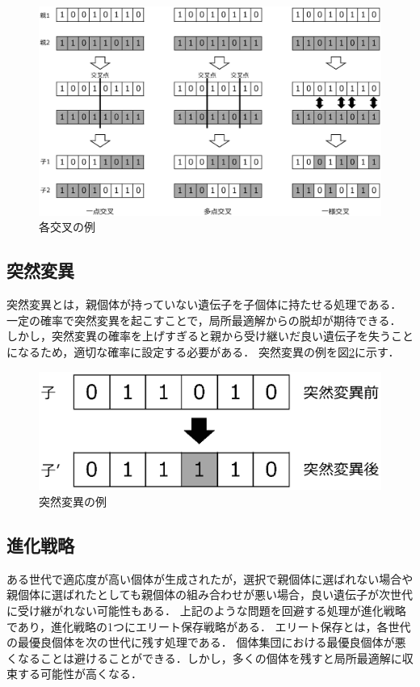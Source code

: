 \begin{figure}[htbp]
    \begin{center}
    \includegraphics[scale=0.6]{image/ga_cross.eps}
    \caption{各交叉の例}
    \label{ga_cross}
    \end{center}
\end{figure}


\subsection{突然変異}
突然変異とは，親個体が持っていない遺伝子を子個体に持たせる処理である．
一定の確率で突然変異を起こすことで，局所最適解からの脱却が期待できる．
しかし，突然変異の確率を上げすぎると親から受け継いだ良い遺伝子を失うことになるため，適切な確率に設定する必要がある．
突然変異の例を図\ref{mutation}に示す．

\begin{figure}[htbp]
    \begin{center}
    \includegraphics[scale=0.6]{image/ga_mutation.eps}
    \caption{突然変異の例}
    \label{mutation}
    \end{center}
\end{figure}


\subsection{進化戦略}
ある世代で適応度が高い個体が生成されたが，選択で親個体に選ばれない場合や親個体に選ばれたとしても親個体の組み合わせが悪い場合，良い遺伝子が次世代に受け継がれない可能性もある．
上記のような問題を回避する処理が進化戦略であり，進化戦略の1つにエリート保存戦略がある．
エリート保存とは，各世代の最優良個体を次の世代に残す処理である．
個体集団における最優良個体が悪くなることは避けることができる．しかし，多くの個体を残すと局所最適解に収束する可能性が高くなる．

